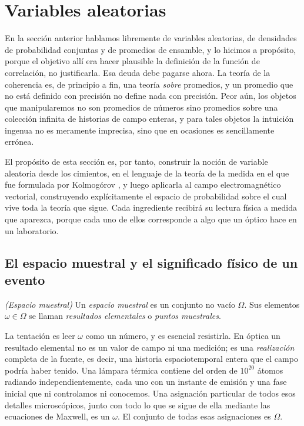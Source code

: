 \section{Variables aleatorias}\label{sec:RandomVariables}

	En la sección anterior hablamos libremente de variables aleatorias, de densidades de probabilidad conjuntas y de promedios de ensamble, y lo hicimos a propósito, porque el objetivo allí era hacer plausible la definición de la función de correlación, no justificarla. Esa deuda debe pagarse ahora. La teoría de la coherencia es, de principio a fin, una teoría \textit{sobre} promedios, y un promedio que no está definido con precisión no define nada con precisión. Peor aún, los objetos que manipularemos no son promedios de números sino promedios sobre una colección infinita de historias de campo enteras, y para tales objetos la intuición ingenua no es meramente imprecisa, sino que en ocasiones es sencillamente errónea.

	El propósito de esta sección es, por tanto, construir la noción de variable aleatoria desde los cimientos, en el lenguaje de la teoría de la medida en el que fue formulada por Kolmogórov \citep{kolmogorov1933grundbegriffe}, y luego aplicarla al campo electromagnético vectorial, construyendo explícitamente el espacio de probabilidad sobre el cual vive toda la teoría que sigue. Cada ingrediente recibirá su lectura física a medida que aparezca, porque cada uno de ellos corresponde a algo que un óptico hace en un laboratorio.

	\subsection{El espacio muestral y el significado físico de un evento}

		\begin{myDef}
			\textit{(Espacio muestral)} Un \textit{espacio muestral} es un conjunto no vacío $\Omega$. Sus elementos $\omega\in\Omega$ se llaman \textit{resultados elementales} o \textit{puntos muestrales}.
		\end{myDef}

		La tentación es leer $\omega$ como un número, y es esencial resistirla. En óptica un resultado elemental no es un valor de campo ni una medición; es una \textit{realización} completa de la fuente, es decir, una historia espaciotemporal entera que el campo podría haber tenido. Una lámpara térmica contiene del orden de $10^{20}$ átomos radiando independientemente, cada uno con un instante de emisión y una fase inicial que ni controlamos ni conocemos. Una asignación particular de todos esos detalles microscópicos, junto con todo lo que se sigue de ella mediante las ecuaciones de Maxwell, es un $\omega$. El conjunto de todas esas asignaciones es $\Omega$.

